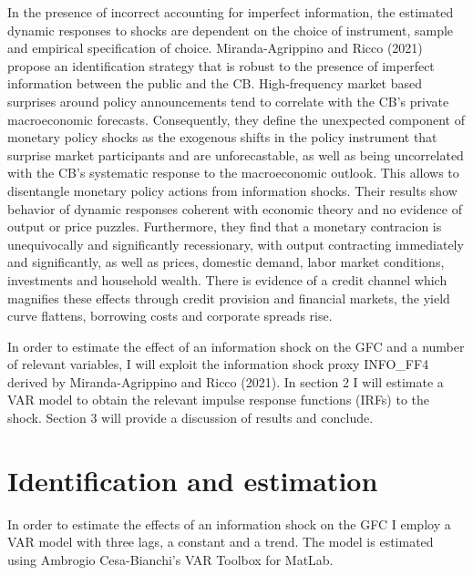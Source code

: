 \documentclass[11pt,a4paper]{article}
\begin{document}
In the presence of incorrect accounting for imperfect information, the estimated dynamic responses to shocks are dependent on the choice of instrument, sample and empirical specification of choice. Miranda-Agrippino and Ricco (2021) propose an identification strategy that is robust to the presence of imperfect information between the public and the CB.
High-frequency market based surprises around policy announcements tend to correlate with the CB's private macroeconomic forecasts. Consequently, they define the unexpected component of monetary policy shocks as the exogenous shifts in the policy instrument that surprise market participants and are unforecastable, as well as being uncorrelated with the CB's systematic response to the macroeconomic outlook.  This allows to disentangle monetary policy actions from information shocks. 
Their results show behavior of dynamic responses coherent with economic theory and no evidence of output or price puzzles. Furthermore, they find that a monetary contracion is unequivocally and significantly recessionary, with output contracting immediately and significantly, as well as prices, domestic demand, labor market conditions, investments and household wealth. There is evidence of a credit channel which magnifies these effects through credit provision and financial markets, the yield curve flattens, borrowing costs and corporate spreads rise.


In order to estimate the effect of an information shock on the GFC and a number of relevant variables, I will exploit the information shock proxy INFO\_FF4 derived by Miranda-Agrippino and Ricco (2021).
In section 2 I will estimate a VAR model to obtain the relevant impulse response functions (IRFs) to the shock.
Section 3 will provide a discussion of results and conclude.



\section{Identification and estimation}
In order to estimate the effects of an information shock on the GFC I employ a VAR model with three lags, a constant and a trend. The model is estimated using Ambrogio Cesa-Bianchi's VAR Toolbox for MatLab. 
\end{document}
